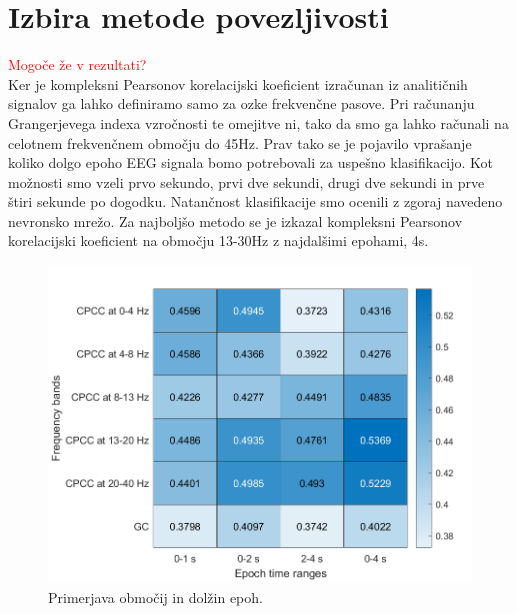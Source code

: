 \section{Izbira metode povezljivosti}
\textcolor{red}{Mogoče že v rezultati?}\\
Ker je kompleksni Pearsonov korelacijski koeficient izračunan iz analitičnih signalov ga lahko definiramo samo za ozke frekvenčne pasove. Pri računanju Grangerjevega indexa vzročnosti te omejitve ni, tako da smo ga lahko računali na celotnem frekvenčnem območju do 45Hz. Prav tako se je pojavilo vprašanje koliko dolgo epoho EEG signala bomo potrebovali za uspešno klasifikacijo. Kot možnosti smo vzeli prvo sekundo, prvi dve sekundi, drugi dve sekundi in prve štiri sekunde po dogodku. Natančnost klasifikacije smo ocenili z zgoraj navedeno nevronsko mrežo. Za najboljšo metodo se je izkazal kompleksni Pearsonov korelacijski koeficient na območju 13-30Hz z najdalšimi epohami, 4s.
\begin{figure}[h!]
    \begin{center}
    \includegraphics[width=0.5\linewidth]{slike/Comparison.png}
    \end{center}
    \caption{Primerjava območij in dolžin epoh.}
\end{figure}




